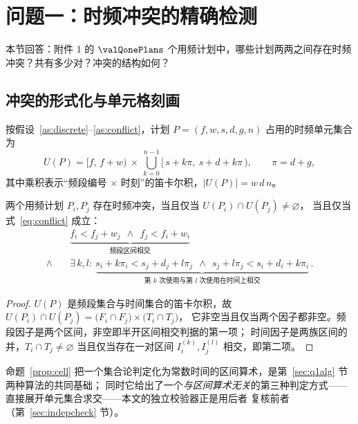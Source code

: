 \section{问题一：时频冲突的精确检测}
\label{sec:q1}

本节回答：附件 1 的 $\valQonePlans$ 个用频计划中，哪些计划两两之间存在时频冲突？共有多少对？冲突的结构如何？

\subsection{冲突的形式化与单元格刻画}

按假设~\ref{as:discrete}--\ref{as:conflict}，计划 $P=(f,w,s,d,g,n)$ 占用的时频单元集合为
\begin{equation}\label{eq:cells}
  U(P)=\bigl[f,\,f+w\bigr)\ \times\ \bigcup_{k=0}^{n-1}\bigl[\,s+k\pi,\ s+d+k\pi\,\bigr),
  \qquad \pi=d+g,
\end{equation}
其中乘积表示“频段编号 $\times$ 时刻”的笛卡尔积，$|U(P)|=w\,d\,n$。

\begin{proposition}[冲突的单元格刻画]\label{prop:cell}
两个用频计划 $P_i,P_j$ 存在时频冲突，当且仅当 $U(P_i)\cap U(P_j)\neq\varnothing$，
当且仅当式~\eqref{eq:conflict} 成立：
\begin{equation}\label{eq:conflict}
  \begin{aligned}
    &\underbrace{f_i<f_j+w_j\ \ \wedge\ \ f_j<f_i+w_i}_{\text{频段区间相交}}\\[2pt]
    \wedge\quad &\exists\,k,l:\ \underbrace{s_i+k\pi_i<s_j+d_j+l\pi_j\ \ \wedge\ \ s_j+l\pi_j<s_i+d_i+k\pi_i}_{\text{第 }k\text{ 次使用与第 }l\text{ 次使用在时间上相交}}\,.
  \end{aligned}
\end{equation}
\end{proposition}

\begin{proof}
$U(P)$ 是频段集合与时间集合的笛卡尔积，故 $U(P_i)\cap U(P_j)=\bigl(F_i\cap F_j\bigr)\times\bigl(T_i\cap T_j\bigr)$，
它非空当且仅当两个因子都非空。频段因子是两个区间，非空即半开区间相交判据的第一项；
时间因子是两族区间的并，$T_i\cap T_j\neq\varnothing$ 当且仅当存在一对区间 $I_i^{(k)},I_j^{(l)}$ 相交，即第二项。
\end{proof}

命题~\ref{prop:cell} 把一个集合论判定化为常数时间的区间算术，是第~\ref{sec:q1alg} 节两种算法的共同基础；
同时它给出了一个\emph{与区间算术无关}的第三种判定方式——直接展开单元集合求交——本文的独立校验器正是用后者
复核前者（第~\ref{sec:indepcheck} 节）。

